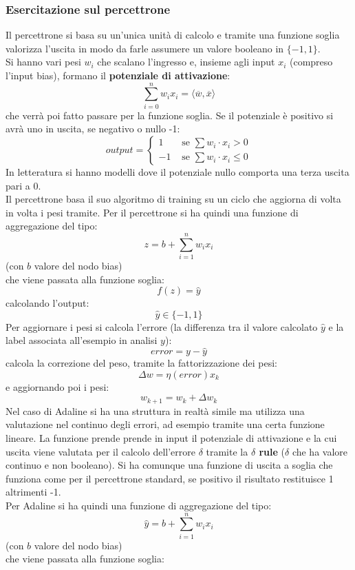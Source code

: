 \documentclass[a4paper,12pt, oneside]{book}
\begin{document}
\subsubsection{Esercitazione sul percettrone}
Il percettrone si basa su un'unica unità di calcolo e tramite una funzione
soglia valorizza l'uscita in modo da farle assumere un valore booleano in
$\{-1,1\}$.\\
Si hanno vari pesi $w_i$ che scalano l'ingresso e, insieme agli input $x_i$
(compreso l'input bias),
formano il \textbf{potenziale di attivazione}:
\[\sum_{i=0}^nw_ix_i=\langle \overline{w}, \overline{x}\rangle\]
che verrà poi fatto passare per la funzione
soglia. Se il potenziale è positivo si avrà uno in uscita, se negativo o nullo
-1:
\[output=
  \begin{cases}
    1 &\mbox{ se } \sum w_i\cdot x_i > 0\\
    -1 &\mbox{ se } \sum w_i\cdot x_i \leq 0
  \end{cases}
\]
In letteratura si hanno modelli dove il potenziale nullo comporta una terza
uscita pari a 0.\\
Il percettrone basa il suo algoritmo di training su un ciclo che aggiorna di
volta in volta i pesi tramite.
Per il percettrone si ha quindi una funzione di aggregazione del tipo:
\[z=b+\sum_{i=1}^nw_ix_i\]
(con $b$ valore del nodo bias)\\
che viene passata alla funzione soglia:
\[f(z)=\hat{y}\]
 calcolando l'output:
\[\hat{y}\in\{-1,1\}\]
Per aggiornare i pesi si calcola l'errore (la differenza tra il valore calcolato
$\hat{y}$ e la label associata all'esempio in analisi $y$):
\[error=y-\hat{y}\]
calcola la correzione del peso, tramite la fattorizzazione dei pesi:
\[\Delta w=\eta(error)x_k\]
e aggiornando poi i pesi:
\[w_{k+1}=w_k+\Delta w_k\]
Nel caso di Adaline si ha una struttura in realtà simile ma utilizza una
valutazione nel continuo degli errori, ad esempio tramite una certa funzione
lineare. La funzione prende prende in input il potenziale di attivazione e la
cui uscita viene valutata per il calcolo dell'errore $\delta$ tramite la
\textbf{$\delta$ rule} ($\delta$ che ha valore continuo e non booleano). Si ha
comunque una funzione di uscita a soglia che funziona come per il percettrone
standard, se positivo il risultato restituisce 1 altrimenti -1.\\
Per Adaline si ha quindi una funzione di aggregazione del tipo:
\[\hat{y}=b+\sum_{i=1}^nw_ix_i\]
(con $b$ valore del nodo bias)\\
che viene passata alla funzione soglia:
\end{document}
